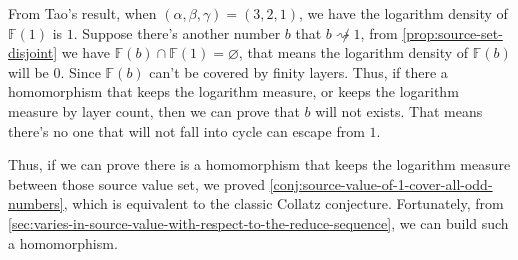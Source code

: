 From Tao's result\cite{tao2022orbitscollatzmapattain}, when $(\alpha, \beta, \gamma) = (3, 2, 1)$, we have the logarithm density of $\mathbb{F}(1)$ is $1$.
Suppose there's another number $b$ that $b \not\rightsquigarrow 1$, from \cref{prop:source-set-disjoint} we have $\mathbb{F}(b)\cap\mathbb{F}(1) = \varnothing$, that means the logarithm density of $\mathbb{F}(b)$ will be $0$.
Since $\mathbb{F}(b)$ can't be covered by finity layers.
Thus, if there a homomorphism that keeps the logarithm measure, or keeps the logarithm measure by layer count, then we can prove that $b$ will not exists. That means there's no one that will not fall into cycle can escape from $1$.

Thus, if we can prove there is a homomorphism that keeps the logarithm measure between those source value set, we proved \cref{conj:source-value-of-1-cover-all-odd-numbers}, which is equivalent to the classic Collatz conjecture.
Fortunately, from \cref{sec:varies-in-source-value-with-respect-to-the-reduce-sequence}, we can build such a homomorphism.

